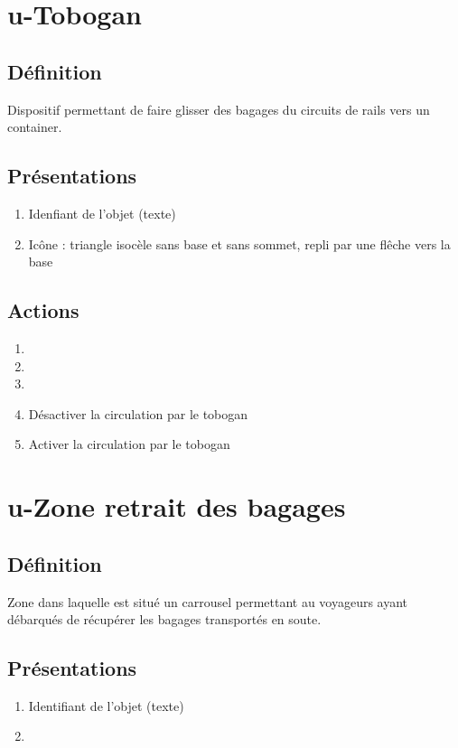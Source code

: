 \section{u-Tobogan}
\subsection{Définition}
	Dispositif permettant de faire glisser des bagages du circuits de rails vers un container.

\subsection{Présentations}
\begin{enumerate}
	\item Idenfiant de l'objet (texte)
	\item Icône : triangle isocèle sans base et sans sommet, repli par une flêche vers la base
\end{enumerate}

\subsection{Actions}
\begin{enumerate}
	\item {}
	\item {}
	\item \etat
	\item Désactiver la circulation par le tobogan
	\item Activer la circulation par le tobogan
\end{enumerate}


\section{u-Zone retrait des bagages}
\subsection{Définition}
	Zone dans laquelle est situé un carrousel permettant au voyageurs ayant débarqués de récupérer les bagages transportés
	en soute.

\subsection{Présentations}
\begin{enumerate}
	\item Identifiant de l'objet (texte)
	\item \rectetiquette
\end{enumerate}

